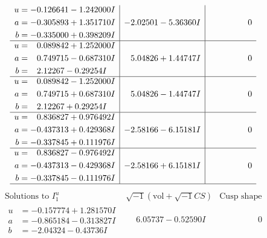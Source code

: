 \documentclass[1p]{elsarticle_modified}
\theoremstyle{definition}
\newcommand{\I}{\sqrt{-1}}
\begin{document}
$$\begin{array}{c|c|c}
\begin{aligned}
u &= -0.126641 - 1.242000 I \\
a &= -0.305893 + 1.351710 I \\
b &= -0.335000 + 0.398209 I\end{aligned}
 & -2.02501 - 5.36360 I & \phantom{-0.000000 } 0 \\ \hline\begin{aligned}
u &= \phantom{-}0.089842 + 1.252000 I \\
a &= \phantom{-}0.749715 - 0.687310 I \\
b &= \phantom{-}2.12267 - 0.29254 I\end{aligned}
 & \phantom{-}5.04826 + 1.44747 I & \phantom{-0.000000 } 0 \\ \hline\begin{aligned}
u &= \phantom{-}0.089842 - 1.252000 I \\
a &= \phantom{-}0.749715 + 0.687310 I \\
b &= \phantom{-}2.12267 + 0.29254 I\end{aligned}
 & \phantom{-}5.04826 - 1.44747 I & \phantom{-0.000000 } 0 \\ \hline\begin{aligned}
u &= \phantom{-}0.836827 + 0.976492 I \\
a &= -0.437313 + 0.429368 I \\
b &= -0.337845 + 0.111976 I\end{aligned}
 & -2.58166 - 6.15181 I & \phantom{-0.000000 } 0 \\ \hline\begin{aligned}
u &= \phantom{-}0.836827 - 0.976492 I \\
a &= -0.437313 - 0.429368 I \\
b &= -0.337845 - 0.111976 I\end{aligned}
 & -2.58166 + 6.15181 I & \phantom{-0.000000 } 0\\
 \hline 
 \end{array}$$\newpage$$\begin{array}{c|c|c}  
\text{Solutions to }I^u_{1}& \I (\text{vol} + \sqrt{-1}CS) & \text{Cusp shape}\\
 \hline 
\begin{aligned}
u &= -0.157774 + 1.281570 I \\
a &= -0.865184 - 0.313827 I \\
b &= -2.04324 - 0.43736 I\end{aligned}
 & \phantom{-}6.05737 - 0.52590 I & \phantom{-0.000000 } 0 \\ \hline\begin{aligned}

\end{aligned}
\end{array}$$
\end{document}
